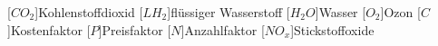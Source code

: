 \label{sec:Symbole}
\begin{acronym}[6LoWPAN]

    [$CO_2$]{Kohlenstoffdioxid}
	[$LH_2$]{flüssiger Wasserstoff}
	[$H_2O$]{Wasser}
	[$O_2$]{Ozon}
	[$C$]{Kostenfaktor}
	[$P$]{Preisfaktor}
	[$N$]{Anzahlfaktor}
	[$NO_x$]{Stickstoffoxide}
\end{acronym}